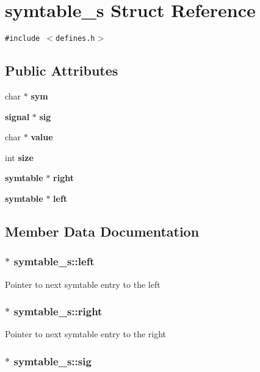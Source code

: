 \section{symtable\_\-s Struct Reference}
\label{structsymtable__s}
{\tt \#include $<$defines.h$>$}

\subsection*{Public Attributes}
\begin{CompactItemize}
\item 
char $\ast$ {\bf sym}
\item 
{\bf signal} $\ast$ {\bf sig}
\item 
char $\ast$ {\bf value}
\item 
int {\bf size}
\item 
{\bf symtable} $\ast$ {\bf right}
\item 
{\bf symtable} $\ast$ {\bf left}
\end{CompactItemize}


\subsection{Member Data Documentation}
\subsubsection{$\ast$ symtable\_\-s::left}\label{structsymtable__s_m5}


Pointer to next symtable entry to the left 
\subsubsection{$\ast$ symtable\_\-s::right}\label{structsymtable__s_m4}


Pointer to next symtable entry to the right 
\subsubsection{$\ast$ symtable\_\-s::sig}\label{structsymtable__s_m1}


